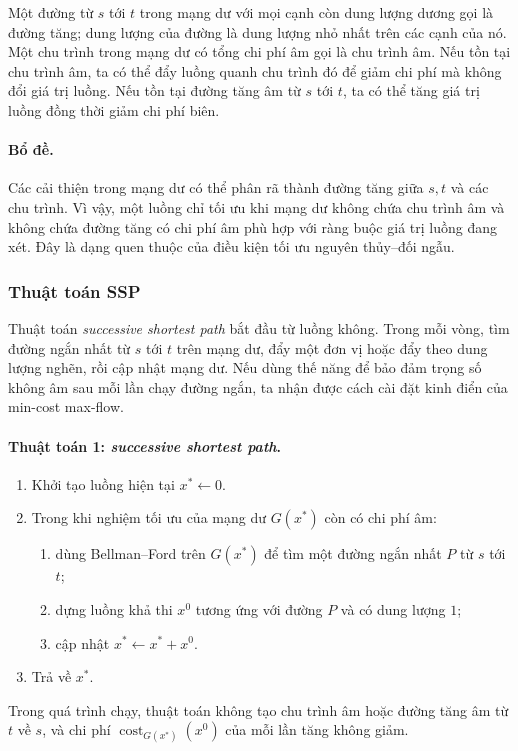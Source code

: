 \documentclass[11pt]{article}
\begin{document}
Một đường từ $s$ tới $t$ trong mạng dư với mọi cạnh còn dung lượng dương gọi là
đường tăng; dung lượng của đường là dung lượng nhỏ nhất trên các cạnh của nó.
Một chu trình trong mạng dư có tổng chi phí âm gọi là chu trình âm. Nếu tồn tại
chu trình âm, ta có thể đẩy luồng quanh chu trình đó để giảm chi phí mà không
đổi giá trị luồng. Nếu tồn tại đường tăng âm từ $s$ tới $t$, ta có thể tăng giá
trị luồng đồng thời giảm chi phí biên.

\paragraph{Bổ đề.}
Các cải thiện trong mạng dư có thể phân rã thành đường tăng giữa $s,t$ và các
chu trình. Vì vậy, một luồng chỉ tối ưu khi mạng dư không chứa chu trình âm và
không chứa đường tăng có chi phí âm phù hợp với ràng buộc giá trị luồng đang
xét. Đây là dạng quen thuộc của điều kiện tối ưu nguyên thủy--đối ngẫu.

\subsubsection{Thuật toán SSP}

Thuật toán \emph{successive shortest path} bắt đầu từ luồng không. Trong mỗi
vòng, tìm đường ngắn nhất từ $s$ tới $t$ trên mạng dư, đẩy một đơn vị hoặc đẩy
theo dung lượng nghẽn, rồi cập nhật mạng dư. Nếu dùng thế năng để bảo đảm trọng
số không âm sau mỗi lần chạy đường ngắn, ta nhận được cách cài đặt kinh điển
của min-cost max-flow.

\paragraph{Thuật toán 1: \emph{successive shortest path}.}
\begin{enumerate}
  \item Khởi tạo luồng hiện tại \(x^*\leftarrow 0\).
  \item Trong khi nghiệm tối ưu của mạng dư \(G(x^*)\) còn có chi phí âm:
  \begin{enumerate}
    \item dùng Bellman--Ford trên \(G(x^*)\) để tìm một đường ngắn nhất
    \(P\) từ \(s\) tới \(t\);
    \item dựng luồng khả thi \(x^0\) tương ứng với đường \(P\) và có dung
    lượng \(1\);
    \item cập nhật \(x^*\leftarrow x^*+x^0\).
  \end{enumerate}
  \item Trả về \(x^*\).
\end{enumerate}
Trong quá trình chạy, thuật toán không tạo chu trình âm hoặc đường tăng âm từ
\(t\) về \(s\), và chi phí \(\operatorname{cost}_{G(x^*)}(x^0)\) của mỗi lần
tăng không giảm.
\end{document}
